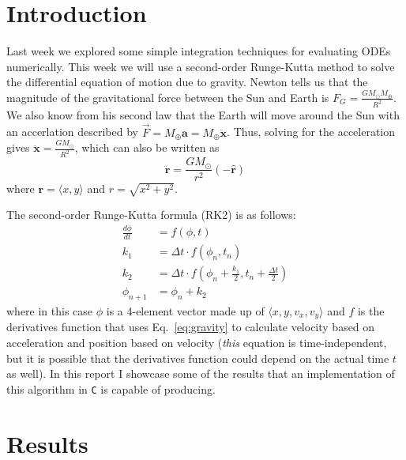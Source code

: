 \documentclass{article}
\author{\hwauthor}
\title{\hwtitle}
\date{\hwdate}
\begin{document}
\maketitle
\thispagestyle{fancy}

\section{Introduction}

Last week we explored some simple integration techniques for evaluating ODEs numerically. This week we will use a second-order Runge-Kutta method to solve the differential equation of motion due to gravity. Newton tells us that the magnitude of the gravitational force between the Sun and Earth is $\displaystyle F_G=\frac{GM_\odot M_\oplus}{R^2}$. We also know from his second law that the Earth will move around the Sun with an accerlation described by $\vec{F}=M_\oplus \mathbf{a} = M_\oplus \ddot{\mathbf{x}}$. Thus, solving for the acceleration gives $\displaystyle \ddot{\mathbf{x}} = \frac{GM_\odot}{R^2}$, which can also be written as \begin{equation} \label{eq:gravity}
    \ddot{\mathbf{r}} = \frac{GM_\odot}{r^2}(-\hat{\mathbf{r}})    
\end{equation}
where $\mathbf{r}=\langle x,y\rangle$ and $r = \sqrt{x^2+y^2}$.

The second-order Runge-Kutta formula (RK2) is as follows: \begin{align*}
    \frac{d\phi}{dt} &= f(\phi,t) \\
    k_1 &= \Delta t \cdot f(\phi_n,t_n) \\
    k_2 &= \Delta t \cdot f\left(\phi_n+\frac{k_1}{2}, t_n+\frac{\Delta t}{2}\right) \\
    \phi_{n+1} &= \phi_n + k_2
\end{align*}
where in this case $\phi$ is a 4-element vector made up of $\langle x,y,v_x,v_y\rangle$ and $f$ is the derivatives function that uses Eq.~\ref{eq:gravity} to calculate velocity based on acceleration and position based on velocity (\emph{this} equation is time-independent, but it is possible that the derivatives function could depend on the actual time $t$ as well). In this report I showcase some of the results that an implementation of this algorithm in \texttt{C} is capable of producing.

\section{Results}
\end{document}
